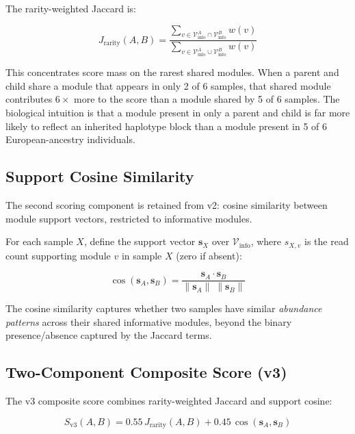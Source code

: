 \documentclass{../yalumba}
\begin{document}
The rarity-weighted Jaccard is:

\begin{equation}
  J_{\text{rarity}}(A, B) =
    \frac{\sum_{v \in \mathcal{V}_{\text{info}}^A \cap \mathcal{V}_{\text{info}}^B} w(v)}
         {\sum_{v \in \mathcal{V}_{\text{info}}^A \cup \mathcal{V}_{\text{info}}^B} w(v)}
  \label{eq:rarity-jaccard}
\end{equation}

This concentrates score mass on the rarest shared modules.  When a parent
and child share a module that appears in only 2 of 6 samples, that shared
module contributes $6\times$ more to the score than a module shared by 5 of
6 samples.  The biological intuition is that a module present in only a parent
and child is far more likely to reflect an inherited haplotype block than a
module present in 5 of 6 European-ancestry individuals.

\subsection{Support Cosine Similarity}

The second scoring component is retained from v2: cosine similarity between
module support vectors, restricted to informative modules.

For each sample $X$, define the support vector $\mathbf{s}_X$ over
$\mathcal{V}_{\text{info}}$, where $s_{X,v}$ is the read count supporting
module $v$ in sample $X$ (zero if absent):

\begin{equation}
  \cos(\mathbf{s}_A, \mathbf{s}_B) =
    \frac{\mathbf{s}_A \cdot \mathbf{s}_B}
         {\|\mathbf{s}_A\| \; \|\mathbf{s}_B\|}
  \label{eq:cosine}
\end{equation}

The cosine similarity captures whether two samples have similar
\emph{abundance patterns} across their shared informative modules, beyond
the binary presence/absence captured by the Jaccard terms.

\subsection{Two-Component Composite Score (v3)}
\label{sec:composite}

The v3 composite score combines rarity-weighted Jaccard and support cosine:

\begin{equation}
  S_{\text{v3}}(A, B) = 0.55 \, J_{\text{rarity}}(A, B)
                       + 0.45 \, \cos(\mathbf{s}_A, \mathbf{s}_B)
  \label{eq:v3-composite}
\end{equation}
\end{document}
